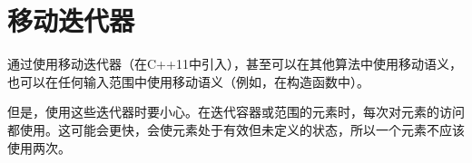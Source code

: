 \section{移动迭代器}
通过使用移动迭代器（在C++11中引入），甚至可以在其他算法中使用移动语义，也可以在任何输入范围中使用移动语义（例如，在构造函数中）。

但是，使用这些迭代器时要小心。在迭代容器或范围的元素时，每次对元素的访问都使用。这可能会更快，会使元素处于有效但未定义的状态，所以一个元素不应该使用两次。
































































